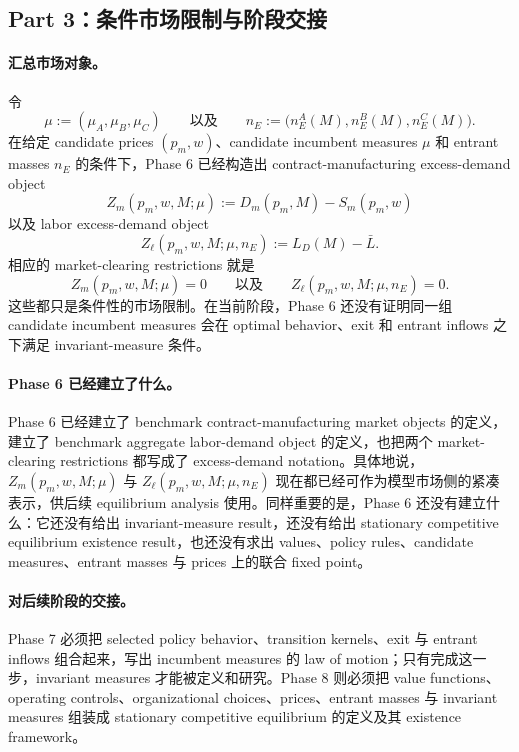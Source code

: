 \subsection{Part 3：条件市场限制与阶段交接}

\paragraph{汇总市场对象。}
令
\[
\mu:=(\mu_A,\mu_B,\mu_C)
\qquad\text{以及}\qquad
n_E:=\bigl(n_E^A(M),n_E^B(M),n_E^C(M)\bigr).
\]
在给定 candidate prices $(p_m,w)$、candidate incumbent measures $\mu$ 和 entrant masses $n_E$ 的条件下，Phase 6 已经构造出 contract-manufacturing excess-demand object
\[
Z_m(p_m,w,M;\mu):=D_m(p_m,M)-S_m(p_m,w)
\]
以及 labor excess-demand object
\[
Z_\ell(p_m,w,M;\mu,n_E):=L_D(M)-\bar L.
\]
相应的 market-clearing restrictions 就是
\[
Z_m(p_m,w,M;\mu)=0
\qquad\text{以及}\qquad
Z_\ell(p_m,w,M;\mu,n_E)=0.
\]
这些都只是条件性的市场限制。在当前阶段，Phase 6 还没有证明同一组 candidate incumbent measures 会在 optimal behavior、exit 和 entrant inflows 之下满足 invariant-measure 条件。

\paragraph{Phase 6 已经建立了什么。}
Phase 6 已经建立了 benchmark contract-manufacturing market objects 的定义，建立了 benchmark aggregate labor-demand object 的定义，也把两个 market-clearing restrictions 都写成了 excess-demand notation。具体地说，$Z_m(p_m,w,M;\mu)$ 与 $Z_\ell(p_m,w,M;\mu,n_E)$ 现在都已经可作为模型市场侧的紧凑表示，供后续 equilibrium analysis 使用。同样重要的是，Phase 6 还没有建立什么：它还没有给出 invariant-measure result，还没有给出 stationary competitive equilibrium existence result，也还没有求出 values、policy rules、candidate measures、entrant masses 与 prices 上的联合 fixed point。

\paragraph{对后续阶段的交接。}
Phase 7 必须把 selected policy behavior、transition kernels、exit 与 entrant inflows 组合起来，写出 incumbent measures 的 law of motion；只有完成这一步，invariant measures 才能被定义和研究。Phase 8 则必须把 value functions、operating controls、organizational choices、prices、entrant masses 与 invariant measures 组装成 stationary competitive equilibrium 的定义及其 existence framework。
